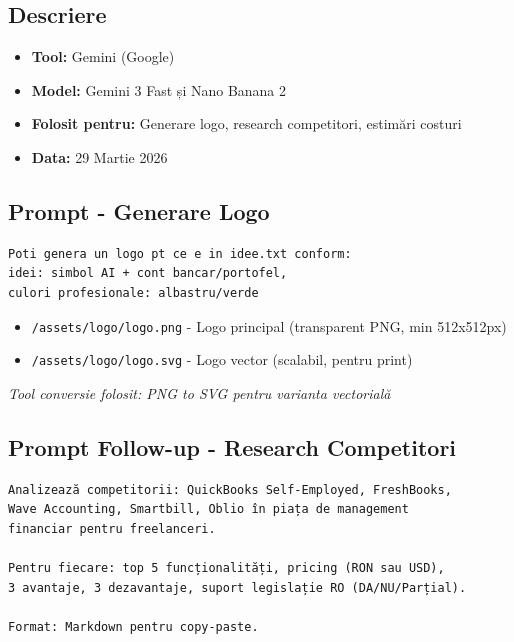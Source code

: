 \documentclass[11pt,a4paper]{article}
\begin{document}
\subsection{Descriere}
\begin{itemize}[leftmargin=*]
    \item \textbf{Tool:} Gemini (Google)
    \item \textbf{Model:} Gemini 3 Fast și Nano Banana 2
    \item \textbf{Folosit pentru:} Generare logo, research competitori, estimări costuri
    \item \textbf{Data:} 29 Martie 2026
\end{itemize}

\subsection{Prompt - Generare Logo}

\begin{tcolorbox}[colback=promptbackground,colframe=blue!75!black,title=Prompt Input]
\begin{verbatim}
Poti genera un logo pt ce e in idee.txt conform:
idei: simbol AI + cont bancar/portofel,
culori profesionale: albastru/verde
\end{verbatim}
\end{tcolorbox}

\begin{tcolorbox}[colback=outputbackground,colframe=green!75!black,title=Output Generat]
\begin{itemize}[leftmargin=*]
    \item \texttt{/assets/logo/logo.png} - Logo principal (transparent PNG, min 512x512px)
    \item \texttt{/assets/logo/logo.svg} - Logo vector (scalabil, pentru print)
\end{itemize}
\textit{Tool conversie folosit: PNG to SVG pentru varianta vectorială}
\end{tcolorbox}

\subsection{Prompt Follow-up - Research Competitori}

\begin{tcolorbox}[colback=promptbackground,colframe=blue!75!black,title=Prompt Input]
\begin{verbatim}
Analizează competitorii: QuickBooks Self-Employed, FreshBooks,
Wave Accounting, Smartbill, Oblio în piața de management
financiar pentru freelanceri.

Pentru fiecare: top 5 funcționalități, pricing (RON sau USD),
3 avantaje, 3 dezavantaje, suport legislație RO (DA/NU/Parțial).

Format: Markdown pentru copy-paste.
\end{verbatim}
\end{tcolorbox}
\end{document}
